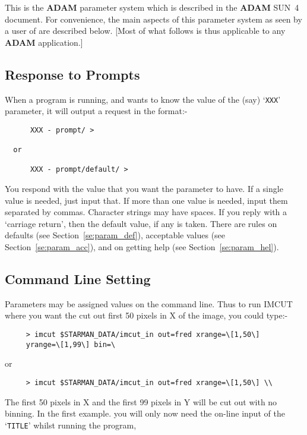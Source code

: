 This is the {\bf ADAM} parameter system which is described in the {\bf
ADAM} SUN~4 document. For convenience, the main aspects of this
parameter system as seen by a user of \starman are described below.
[Most of what follows is thus applicable to any {\bf ADAM}
application.]

\subsection{Response to Prompts}

When a program is running, and wants to know the value of the (say)
`\verb|XXX|' parameter, it will output a request in the format:-

\begin{verbatim}
      XXX - prompt/ >

  or

      XXX - prompt/default/ > \end{verbatim}

You respond with the value that you want the parameter to have. If a
single value is needed, just input that. If more than one value is
needed, input them separated by commas. Character strings may have
spaces. If you reply with a `carriage return', then the default value,
if any is taken. There are rules on defaults (see
Section~\ref{se:param_def}), acceptable values (see
Section~\ref{se:param_acc}), and on getting help (see
Section~\ref{se:param_hel}).

\subsection{Command Line Setting}

Parameters may be assigned values on the command line. Thus to run
IMCUT where you want the cut out first 50 pixels in X of the image, you
could type:-

\begin{verbatim}
     > imcut $STARMAN_DATA/imcut_in out=fred xrange=\[1,50\]
     yrange=\[1,99\] bin=\ \end{verbatim}

or

\begin{verbatim}
     > imcut $STARMAN_DATA/imcut_in out=fred xrange=\[1,50\] \\
\end{verbatim}


The first 50 pixels in X and the first 99 pixels in Y will be cut out
with no binning. In the first example. you will only now need the
on-line input of the `\verb|TITLE|' whilst running the program,

